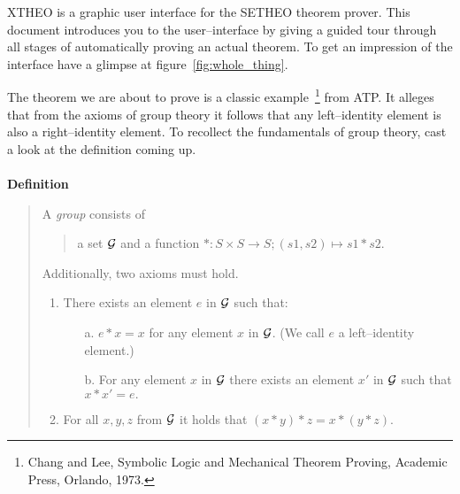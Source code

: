 XTHEO is a graphic user interface for the SETHEO theorem prover.
This document introduces you to the user--interface by giving a 
guided tour through all stages of automatically proving an actual theorem.
To get an impression of the interface have a glimpse at figure~\ref{fig:whole_thing}.


The theorem we are about to prove is a classic example~\footnote{Chang and Lee, 
Symbolic Logic and Mechanical Theorem Proving, Academic Press, Orlando, 1973.} from ATP.
It alleges that from the axioms of group theory it follows that any
left--identity element is also a right--identity element. 
To recollect the fundamentals of group theory, cast a look at the definition coming up.
\\ \\
{\bf Definition}
\begin{quote}
A {\it group\/} consists of 
\begin{quote}
a set $\cal G$ 
and 
a function $* : S \times S \rightarrow S; (s1,s2) \mapsto s1 * s2$. 
\end{quote}
Additionally, two axioms must hold.
\begin{enumerate}
\item There exists an element $e$ in $\cal G$ such that: \\
\begin{itemize}
\item[a.]$e * x = x$ for any element $x$ in $\cal G$. 
(We call $e$ a left--identity element.) 
\item[b.] For any element $x$ in $\cal G$ there exists an element $x'$ in $\cal G$ such that 
$x * x' = e.$ \\ 
\end{itemize}
\item For all $x, y, z$ from $\cal G$ it holds that $(x * y) * z = x * (y * z)$.
\end{enumerate}
\end{quote}


